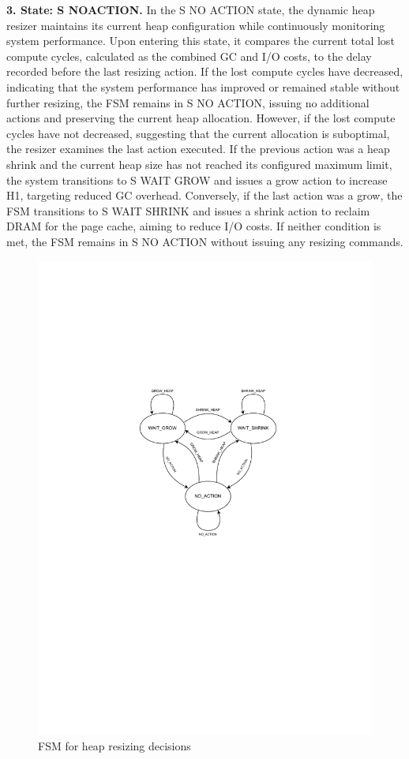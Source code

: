 \textbf{3. State: S NOACTION.}
In the S NO ACTION state, the dynamic heap resizer maintains its current heap configuration while continuously monitoring system performance. Upon entering this state, it compares the current total lost compute cycles, calculated as the combined GC and I/O costs, to the delay recorded before the last resizing action. If the lost compute cycles have decreased, indicating that the system performance has improved or remained stable without further resizing, the FSM remains in S NO ACTION, issuing no additional actions and preserving the current heap allocation. However, if the lost compute cycles have not decreased, suggesting that the current allocation is suboptimal, the resizer examines the last action executed. If the previous action was a heap shrink and the current heap size has not reached its configured maximum limit, the system transitions to S WAIT GROW and issues a grow action to increase H1, targeting reduced GC overhead. Conversely, if the last action was a grow, the FSM transitions to S WAIT SHRINK and issues a shrink action to reclaim DRAM for the page cache, aiming to reduce I/O costs. If neither condition is met, the FSM remains in S NO ACTION without issuing any resizing commands.

\vspace{0.2cm}

\begin{figure}[htbp]
  \centering
\includegraphics[width=1.1\columnwidth]{fig/FSM.pdf}
  \caption{FSM for heap resizing decisions}
  \label{fig:fsm}
\end{figure}

